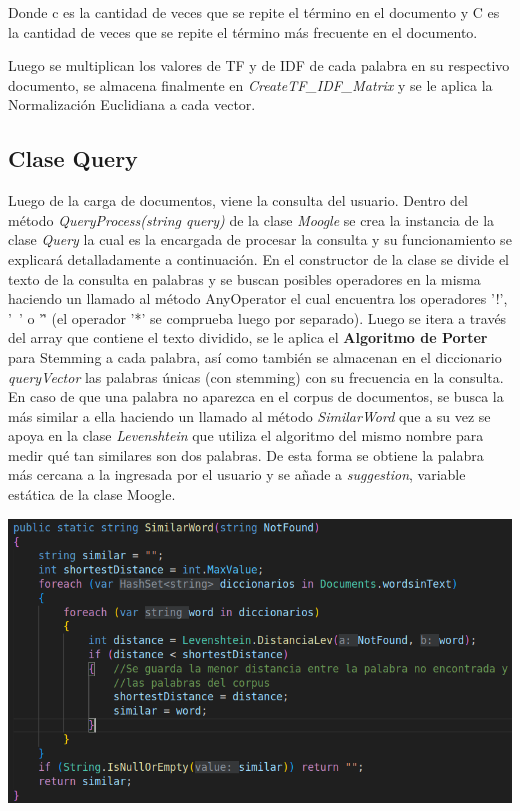 \documentclass{article}
\begin{document}
Donde c es la cantidad de veces que se repite el término en el documento y C es la cantidad de veces que se repite el término más frecuente en el documento.

Luego se multiplican los valores de TF y de IDF de cada palabra en su respectivo documento, se almacena finalmente en \textit{CreateTF\_IDF\_Matrix} y se le aplica la Normalización Euclidiana a cada vector.

\subsection{Clase Query}

Luego de la carga de documentos, viene la consulta del usuario. Dentro del método \textit{QueryProcess(string query)} de la clase \textit{Moogle} se crea la instancia de la clase \textit{Query} la cual es la encargada de procesar la consulta y su funcionamiento se explicará detalladamente a continuación.
En el constructor de la clase se divide el texto de la consulta en palabras y se buscan posibles operadores en la misma haciendo un llamado al método AnyOperator el cual encuentra los operadores '!', '~' o '\^' (el operador '*' se comprueba luego por separado). Luego se itera a través del array que contiene el texto dividido, se le aplica el \textbf{Algoritmo de Porter} para Stemming a cada palabra, así como también se almacenan en el diccionario \textit{queryVector} las palabras únicas (con stemming) con su frecuencia en la consulta.
En caso de que una palabra no aparezca en el corpus de documentos, se busca la más similar a ella haciendo un llamado al método \textit{SimilarWord} que a su vez se apoya en la clase \textit{Levenshtein} que utiliza el algoritmo del mismo nombre para medir qué tan similares son dos palabras. De esta forma se obtiene
la palabra más cercana a la ingresada por el usuario y se añade a \textit{suggestion}, variable estática de la clase Moogle.

\vspace{0.5cm}
\includegraphics[width=0.5\linewidth]{similar.png}
\vspace{0.5cm}
\end{document}
